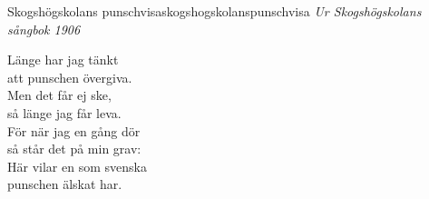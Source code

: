 \begin{song}{Skogshögskolans punschvisa}{skogshogskolanspunschvisa}
\textit{Ur Skogshögskolans sångbok 1906}
\begin{vers}
Länge har jag tänkt \\
att punschen övergiva.\\
Men det får ej ske,\\
så länge jag får leva.\\
För när jag en gång dör\\
så står det på min grav:\\
Här vilar en som svenska \\
punschen älskat har.\\
\end{vers}
\end{song}
